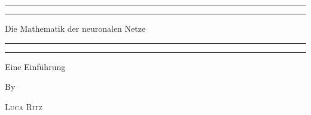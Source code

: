 \begin{titlepage} %

	\centering %

	\scshape %

	\vspace*{\baselineskip} %


	\rule{\textwidth}{1.6pt}\vspace*{-\baselineskip}\vspace*{2pt} %
	\rule{\textwidth}{0.4pt} %

	\vspace{0.75\baselineskip} %

	{\LARGE Die Mathematik der neuronalen Netze \\} %

	\vspace{0.75\baselineskip} %

	\rule{\textwidth}{0.4pt}\vspace*{-\baselineskip}\vspace{3.2pt} %
	\rule{\textwidth}{1.6pt} %

	\vspace{2\baselineskip} %


	Eine Einführung %

	\vspace*{3\baselineskip} %


	By

	\vspace{0.5\baselineskip} %

	{\scshape\Large Luca Ritz} %

	\vspace{0.5\baselineskip} %


\end{titlepage}
